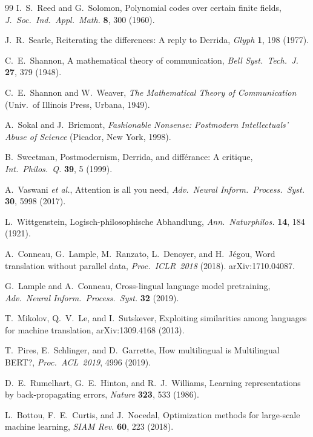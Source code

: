 \documentclass[a4paper,twocolumn,11pt]{article}
\begin{document}
\begin{thebibliography}{99}
I.~S.~Reed and G.~Solomon,
Polynomial codes over certain finite fields,
\emph{J.\ Soc.\ Ind.\ Appl.\ Math.} \textbf{8}, 300 (1960).

J.~R.~Searle,
Reiterating the differences: A reply to Derrida,
\emph{Glyph} \textbf{1}, 198 (1977).

C.~E.~Shannon,
A mathematical theory of communication,
\emph{Bell Syst.\ Tech.\ J.} \textbf{27}, 379 (1948).

C.~E.~Shannon and W.~Weaver,
\emph{The Mathematical Theory of Communication}
(Univ.\ of Illinois Press, Urbana, 1949).

A.~Sokal and J.~Bricmont,
\emph{Fashionable Nonsense: Postmodern Intellectuals' Abuse of Science}
(Picador, New York, 1998).

B.~Sweetman,
Postmodernism, Derrida, and diff\'erance: A critique,
\emph{Int.\ Philos.\ Q.} \textbf{39}, 5 (1999).

A.~Vaswani \emph{et al.},
Attention is all you need,
\emph{Adv.\ Neural Inform.\ Process.\ Syst.} \textbf{30}, 5998 (2017).

L.~Wittgenstein,
Logisch-philosophische Abhandlung,
\emph{Ann.\ Naturphilos.} \textbf{14}, 184 (1921).

A.~Conneau, G.~Lample, M.~Ranzato, L.~Denoyer, and H.~J\'egou,
Word translation without parallel data,
\emph{Proc.\ ICLR~2018} (2018). arXiv:1710.04087.

G.~Lample and A.~Conneau,
Cross-lingual language model pretraining,
\emph{Adv.\ Neural Inform.\ Process.\ Syst.} \textbf{32} (2019).

T.~Mikolov, Q.~V.~Le, and I.~Sutskever,
Exploiting similarities among languages for machine translation,
arXiv:1309.4168 (2013).

T.~Pires, E.~Schlinger, and D.~Garrette,
How multilingual is Multilingual BERT?,
\emph{Proc.\ ACL~2019}, 4996 (2019).

D.~E.~Rumelhart, G.~E.~Hinton, and R.~J.~Williams,
Learning representations by back-propagating errors,
\emph{Nature} \textbf{323}, 533 (1986).

L.~Bottou, F.~E.~Curtis, and J.~Nocedal,
Optimization methods for large-scale machine learning,
\emph{SIAM Rev.} \textbf{60}, 223 (2018).


\end{thebibliography}
\end{document}

